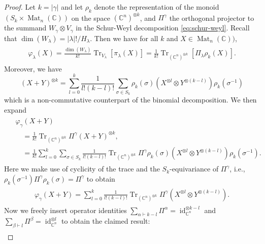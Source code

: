 \documentclass[10pt,a4paper]{amsart}
\DeclareMathOperator{\Mat}{Mat}
\DeclareMathOperator{\Tr}{Tr}
\DeclareMathOperator{\id}{id}
\newcommand{\ot}{\otimes} %
\newcommand{\syc}{|\yc|}
\newcommand{\syx}{|\yx|}
\newcommand{\vp}{\varphi} %
\newcommand{\ya}{\alpha}
\newcommand{\yb}{\beta}
\newcommand{\yc}{\gamma}
\newcommand{\yx}{\lambda}
\begin{document}
\begin{proof}
    Let $k=\syc$ and let $\rho_k$ denote the representation of the monoid $(S_k \times \Mat_n(\mathbb{C}))$ on the space $(\mathbb{C}^n)^{\ot k}$, and $\Pi^\yc$ the orthogonal projector to the summand $W_\yc \ot V_\yc$ in the Schur-Weyl decomposition \cref{eq:schur-weyl}.
    Recall that $\dim(W_{\yx}) = \syx! / H_{\yx}$.
    Then we have for all $k$ and $X \in \Mat_n(\mathbb{C}))$,
    \begin{align}
        \begin{split}
            \vp_{\yx}(X)
            = \frac{\dim(W_{\yx})}{k!} \Tr_{V_\yx}[\pi_\yx(X)]
            = \frac{1}{k!} \Tr_{(\mathbb{C}^n)^{\ot k}}[\Pi_{\yx} \rho_{k}(X)].
        \end{split}
    \end{align}
    Moreover, we have
    \begin{equation}
        (X+Y)^{\ot k} = \sum_{l=0}^k \frac{1}{l!(k-l)!}\sum_{\sigma \in S_k} \rho_k(\sigma) (X^{\ot l} \ot Y^{\ot (k-l)})\rho_k(\sigma^{-1})
    \end{equation}
    which is a non-commutative counterpart of the binomial decomposition.
    We then expand
    \begin{align}
        \begin{split}
            &\vp_\yc(X+Y) \\
            &\quad= \frac{1}{k!} \Tr_{(\mathbb{C}^n)^{\ot k}} \Pi^\yc  (X+Y)^{\ot k}, \\
            &\quad= \frac{1}{k!}\sum_{l=0}^k \sum_{\sigma \in S_k} \frac{1}{l! (k-l)!} \Tr_{(\mathbb{C}^n)^{\ot k}} \Pi^\yc \rho_k(\sigma) (X^{\ot l} \ot Y^{\ot (k-l)})\rho_k(\sigma^{-1}).
        \end{split}
    \end{align}
    Here we make use of cyclicity of the trace and the $S_k$-equivariance of $\Pi^{\yc}$, i.e., $\rho_k(\sigma^{-1}) \Pi^\yc \rho_k(\sigma) = \Pi^\yc$ to obtain
    \begin{align}
        \begin{split}
            \vp_\yc(X+Y)
            = \sum_{l=0}^k \frac{1}{l! (k-l)!} \Tr_{(\mathbb{C}^n)^{\ot k}} \Pi^\yc (X^{\ot l} \ot Y^{\ot (k-l)}).
        \end{split}
    \end{align}
    Now we freely insert operator identities $\sum_{\ya \vdash k-l} \Pi^{\ya} = \id_{\mathbb C^n}^{\otimes k-l}$ and $\sum_{\yb \vdash l} \Pi^{\yb} = \id_{\mathbb C^n}^{\otimes l}$ to obtain the claimed result:
    \begin{align}

\end{align}
\end{proof}
\end{document}
